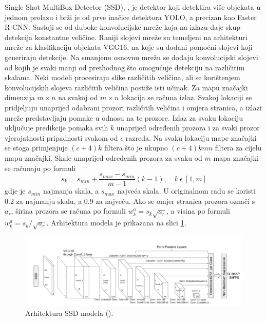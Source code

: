 Single Shot MultiBox Detector (SSD), \cite{DBLP:journals/corr/LiuAESR15}, je detektor koji detektira više objekata u jednom prolazu i brži je od prve inačice detektora YOLO, a precizan kao Faster R-CNN. 
Sastoji se od duboke konvolucijske mreže koja na izlazu daje skup detekcija konstantne veličine. Raniji slojevi mreže su temeljeni na arhitekturi mreže za klasifikaciju objekata VGG16, na koje su dodani pomoćni slojevi koji generiraju detekcije. Na smanjenu osnovnu mrežu se dodaju konvolucijski slojevi od kojih je svaki manji od prethodnog što omogućuje detekciju na različitim skalama. Neki modeli procesiraju slike različitih veličina, ali se korištenjem konvolucijskih slojeva različitih veličina postiže isti učinak.
Za mapu značajki dimenzija $m \times n$ na svakoj od $m \times n$ lokacija se računa izlaz. Svakoj lokaciji se pridjeljuju unaprijed odabrani prozori različitih veličina i omjera stranica, a izlazi mreže predstavljaju pomake u odnosu na te prozore. Izlaz za svaku lokaciju uključuje predikcije pomaka svih $k$ unaprijed određenih prozora i za svaki prozor vjerojatnosti pripadnosti svakom od $c$ razreda. Na svaku lokaciju mape značajki se stoga primjenjuje $(c + 4)k$ filtera što je ukupno $(c + 4)kmn$ filtera za cijelu mapu značajki. Skale unaprijed određenih prozora za svaku od $m$ mapa značajki se računaju po formuli
\[
	s_k = s_{min} + \frac{s_{max} -s_{min}}{m - 1}(k - 1), \quad k \ \epsilon \ [1, m]
\]gdje je $s_{min}$ najmanja skala, a $s_{max}$ najveća skala. U originalnom radu se koristi 0.2 za najmanju skalu, a 0.9 za najveću. Ako se omjer stranica prozora označi s $a_r$, širina prozora se računa po formuli $w_k^a = s_k \sqrt{a_r}$, a visina po formuli $w_k^a = s_k / \sqrt{a_r}$. Arhitektura modela je prikazana na slici \ref{ssd_arhitektura}.

 \begin{figure}
	\centering
	\includegraphics[scale=0.5]{img/ssd_arhitektura.png}
	\caption{Arhitektura SSD modela (\cite{DBLP:journals/corr/LiuAESR15}).}
	\label{ssd_arhitektura}
\end{figure}


